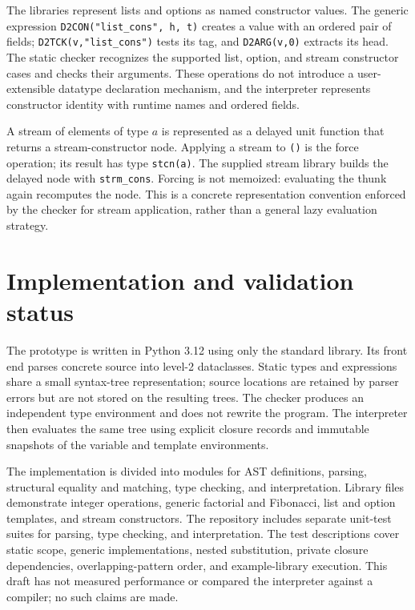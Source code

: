 \documentclass[11pt]{article}
\begin{document}
The libraries represent lists and options as named constructor values. The
generic expression \texttt{D2CON("list\_cons", h, t)} creates a value with an
ordered pair of fields; \texttt{D2TCK(v,"list\_cons")} tests its tag, and
\texttt{D2ARG(v,0)} extracts its head. The static checker recognizes the
supported list, option, and stream constructor cases and checks their
arguments. These operations do not introduce a user-extensible datatype
declaration mechanism, and the interpreter represents constructor identity
with runtime names and ordered fields.

A stream of elements of type \(a\) is represented as a delayed unit function
that returns a stream-constructor node. Applying a stream to \texttt{()} is
the force operation; its result has type \texttt{stcn(a)}. The supplied
stream library builds the delayed node with \texttt{strm\_cons}. Forcing is
not memoized: evaluating the thunk again recomputes the node. This is a
concrete representation convention enforced by the checker for stream
application, rather than a general lazy evaluation strategy.

\section{Implementation and validation status}

The prototype is written in Python 3.12 using only the standard library. Its
front end parses concrete source into level-2 dataclasses. Static types and
expressions share a small syntax-tree representation; source locations are
retained by parser errors but are not stored on the resulting trees. The
checker produces an independent type environment and does not rewrite the
program. The interpreter then evaluates the same tree using explicit closure
records and immutable snapshots of the variable and template environments.

The implementation is divided into modules for AST definitions, parsing,
structural equality and matching, type checking, and interpretation. Library
files demonstrate integer operations, generic factorial and Fibonacci, list
and option templates, and stream constructors. The repository includes
separate unit-test suites for parsing, type checking, and interpretation. The
test descriptions cover static scope, generic implementations, nested
substitution, private closure dependencies, overlapping-pattern order, and
example-library execution. This draft has not measured performance or
compared the interpreter against a compiler; no such claims are made.
\end{document}
